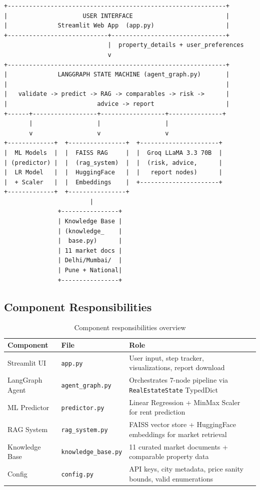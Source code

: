 \documentclass[12pt,a4paper]{article}
\newcommand{\code}[1]{\texttt{\small #1}}
\begin{document}
\begin{lstlisting}[language={}, caption={High-level system architecture}, label={lst:arch}]
+-------------------------------------------------------------+
|                     USER INTERFACE                          |
|              Streamlit Web App  (app.py)                    |
+----------------------------+--------------------------------+
                             |  property_details + user_preferences
                             v
+-------------------------------------------------------------+
|              LANGGRAPH STATE MACHINE (agent_graph.py)       |
|                                                             |
|   validate -> predict -> RAG -> comparables -> risk ->      |
|                         advice -> report                    |
+------+------------------+------------------+---------------+
       |                  |                  |
       v                  v                  v
+-------------+  +----------------+  +----------------------+
|  ML Models  |  |  FAISS RAG     |  |  Groq LLaMA 3.3 70B  |
| (predictor) |  |  (rag_system)  |  |  (risk, advice,      |
|  LR Model   |  |  HuggingFace   |  |   report nodes)      |
|  + Scaler   |  |  Embeddings    |  +----------------------+
+-------------+  +----------------+
                        |
               +----------------+
               | Knowledge Base |
               | (knowledge_    |
               |  base.py)      |
               | 11 market docs |
               | Delhi/Mumbai/  |
               | Pune + National|
               +----------------+
\end{lstlisting}

\subsection{Component Responsibilities}

\begin{table}[H]
\centering
\caption{Component responsibilities overview}
\begin{tabularx}{\textwidth}{lllX}
\toprule
\textbf{Component} & \textbf{File} & \textbf{Role} \\
\midrule
Streamlit UI      & \code{app.py}            & User input, step tracker, visualizations, report download \\
LangGraph Agent   & \code{agent\_graph.py}   & Orchestrates 7-node pipeline via \code{RealEstateState} TypedDict \\
ML Predictor      & \code{predictor.py}      & Linear Regression + MinMax Scaler for rent prediction \\
RAG System        & \code{rag\_system.py}    & FAISS vector store + HuggingFace embeddings for market retrieval \\
Knowledge Base    & \code{knowledge\_base.py}& 11 curated market documents + comparable property data \\
Config            & \code{config.py}         & API keys, city metadata, price sanity bounds, valid enumerations \\
\bottomrule
\end{tabularx}
\end{table}
\end{document}

